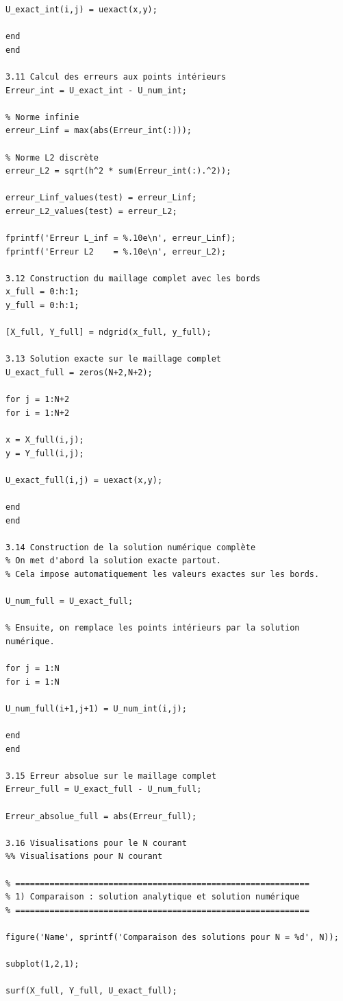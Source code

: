 \documentclass[12pt,a4paper]{article}
\begin{document}
\begin{lstlisting}[style=matlabstyle, caption={Code MATLAB utilisé pour la résolution numérique du problème de Poisson.}, label={code:matlab_poisson}]
U_exact_int(i,j) = uexact(x,y);

end
end

3.11 Calcul des erreurs aux points intérieurs
Erreur_int = U_exact_int - U_num_int;

% Norme infinie
erreur_Linf = max(abs(Erreur_int(:)));

% Norme L2 discrète
erreur_L2 = sqrt(h^2 * sum(Erreur_int(:).^2));

erreur_Linf_values(test) = erreur_Linf;
erreur_L2_values(test) = erreur_L2;

fprintf('Erreur L_inf = %.10e\n', erreur_Linf);
fprintf('Erreur L2    = %.10e\n', erreur_L2);

3.12 Construction du maillage complet avec les bords
x_full = 0:h:1;
y_full = 0:h:1;

[X_full, Y_full] = ndgrid(x_full, y_full);

3.13 Solution exacte sur le maillage complet
U_exact_full = zeros(N+2,N+2);

for j = 1:N+2
for i = 1:N+2

x = X_full(i,j);
y = Y_full(i,j);

U_exact_full(i,j) = uexact(x,y);

end
end

3.14 Construction de la solution numérique complète
% On met d'abord la solution exacte partout.
% Cela impose automatiquement les valeurs exactes sur les bords.

U_num_full = U_exact_full;

% Ensuite, on remplace les points intérieurs par la solution numérique.

for j = 1:N
for i = 1:N

U_num_full(i+1,j+1) = U_num_int(i,j);

end
end

3.15 Erreur absolue sur le maillage complet
Erreur_full = U_exact_full - U_num_full;

Erreur_absolue_full = abs(Erreur_full);

3.16 Visualisations pour le N courant
%% Visualisations pour N courant

% ============================================================
% 1) Comparaison : solution analytique et solution numérique
% ============================================================

figure('Name', sprintf('Comparaison des solutions pour N = %d', N));

subplot(1,2,1);

surf(X_full, Y_full, U_exact_full);


\end{lstlisting}
\end{document}
